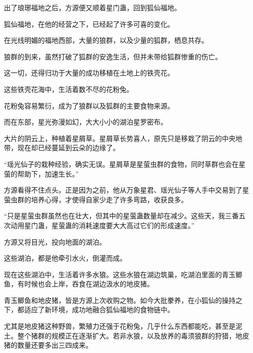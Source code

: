 \begin{this_body}
出了琅琊福地之后，方源便又顺着星门蛊，回到狐仙福地。

狐仙福地，在他的经营之下，已经起了许多可喜的变化。

在光线明媚的福地西部，大量的狼群，以及少量的狐群，栖息共存。

狼群的到来，虽然打破了狐群的安逸生活，但并未带给狐群惨重的伤亡。

这一切，还得归功于大量的成功移植在土地上的铁壳花。

这些铁壳花海中，生活着数不尽的花粉兔。

花粉兔容易繁衍，成为了狼群以及狐群的主要食物来源。

而在东部，星光弥漫如幻，大大小小的湖泊星罗密布。

大片的阴云上，种植着星屑草。星屑草长势喜人，原先只是移栽了阴云的中央地带，现在却已经蔓延到云朵的边缘了。

“瑶光仙子的栽种经验，确实无误。星屑草是星萤虫群的食物，同时草群也会在星萤的帮助下，加速生长。”

方源看得不住点头。正是因为之前，他从万象星君、瑶光仙子等人手中交易到了星萤虫群的培养心得，才使得自家少走了许多弯路，收获良多。

“只是星萤虫群虽然也在壮大，但其中的星萤蛊数量却在减少。这些天，我三番五次动用星门蛊，星萤蛊的消耗速度要大大高过它们的形成速度。”

方源又将目光，投向地面的湖泊。

这些湖泊，都是他牵引水火，倒灌而成。

现在这些湖泊中，生活着许多水狼。这些水狼在湖边筑巢，吃湖泊里面的青玉鲫鱼，有时候也会上岸，吞食在湖边汲水的地皮猪。

青玉鲫鱼和地皮猪，皆是方源上次收购之物。如今大批豢养，在小狐仙的操持之下，都适应了新环境，成功地融合狐仙福地的食物链中。

尤其是地皮猪这种野兽，繁殖力还强于花粉兔，几乎什么东西都能吃，甚至是泥土。整个猪群的规模正在逐渐扩大。若非水狼，以及放养的毒须狼群的狩猎，地皮猪的数量还要多出三四成来。

\end{this_body}

